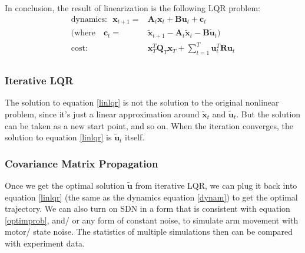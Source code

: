 In conclusion, the result of linearization is the following LQR problem:
\begin{equation}\label{linlqr}
\begin{split}
\text{dynamics:~~}\bm{x}_{t+1} =& \bm{A}_t \bm{x}_t + \bm{B}\bm{u}_t + \bm{c}_t \\
(\text{where~~~}\bm{c}_t = & \tilde{\bm{x}}_{t+1} - \bm{A}_t\tilde{\bm{x}}_{t} - \bm{B}\tilde{\bm{u}}_t) \\
\text{cost:~~~~~~~~~~~} & \bm{x}_T^T\bm{Q}_T\bm{x}_T + \sum_{t=1}^T\bm{u}_t^T\bm{Ru}_t \\
\end{split}
\end{equation}

\subsubsection{Iterative LQR}
The solution to equation \ref{linlqr} is not the solution to the original nonlinear problem, since it's just a linear approximation around $\tilde{\bm{x}}_t$ and $\tilde{\bm{u}}_t$. But the solution can be taken as a new start point, and so on. When the iteration converges, the solution to equation \ref{linlqr} is $\tilde{\bm{u}}_t$ itself.

\subsubsection{Covariance Matrix Propagation}\label{app:covarProp}
Once we get the optimal solution $\tilde{\bm{u}}$ from iterative LQR, we can plug it back into equation \ref{linlqr} (the same as the dynamics equation \ref{dynam}) to get the optimal trajectory. We can also turn on SDN in a form that is consistent with equation \ref{optimprob}, and/ or any form of constant noise, to simulate arm movement with motor/ state noise. The statistics of multiple simulations then can be compared with experiment data.

